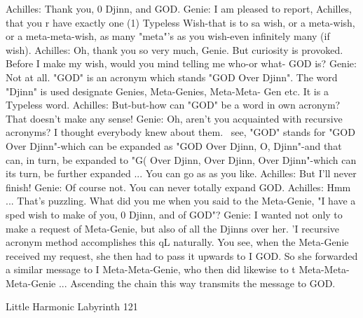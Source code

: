           Achilles: Thank you, 0 Djinn, and GOD.
          Genie: I am pleased to report, Achilles, that you r have exactly one (1)
                 Typeless Wish-that is to sa wish, or a meta-wish, or a meta-meta-wish,
                 as many "meta"'s as you wish-even infinitely many (if wish).
          Achilles: Oh, thank you so very much, Genie. But curiosity is provoked.
                 Before I make my wish, would you mind telling me who-or what-
                 GOD is?
          Genie: Not at all. "GOD" is an acronym which stands "GOD Over Djinn".
                 The word "Djinn" is used designate Genies, Meta-Genies, Meta-Meta-
                 Gen etc. It is a Typeless word.
          Achilles: But-but-how can "GOD" be a word in own acronym? That doesn't
                 make any sense!
          Genie: Oh, aren't you acquainted with recursive acronyms? I thought
                 everybody knew about them. \ see, "GOD" stands for "GOD Over
                 Djinn"-which can be expanded as "GOD Over Djinn, O, Djinn"-and
                 that can, in turn, be expanded to "G( Over Djinn, Over Djinn, Over
                 Djinn"-which can its turn, be further expanded ... You can go as as
                 you like.
          Achilles: But I'll never finish!
          Genie: Of course not. You can never totally expand GOD.
          Achilles: Hmm ... That's puzzling. What did you me when you said to the
                 Meta-Genie, "I have a sped wish to make of you, 0 Djinn, and of
                 GOD"?
          Genie: I wanted not only to make a request of Meta-Genie, but also of all the
                 Djinns over her. 'I recursive acronym method accomplishes this qL
                 naturally. You see, when the Meta-Genie received my request, she
                 then had to pass it upwards to I GOD. So she forwarded a similar
                 message to I Meta-Meta-Genie, who then did likewise to t Meta-Meta-
                 Meta-Genie ... Ascending the chain this way transmits the message to
                 GOD.




Little Harmonic Labyrinth                                                          121

